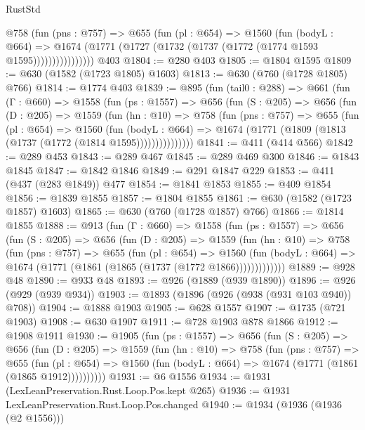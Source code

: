 \begin{lexlean}{RustStd}
\begin{coremodule}
{\begin{coremodule}
{{{{{{{{{{                @758
                  (fun (pns : @757) =>
                  @655
                    (fun (pl : @654) =>
                    @1560
                      (fun (bodyL : @664) =>
                      @1674 (@1771 (@1727 (@1732 (@1737 (@1772 (@1774 @1593 @1595))))))))))))))))
    @403
@1804 := @280 @403
@1805 := @1804 @1595
@1809 := @630 (@1582 (@1723 @1805) @1603)
@1813 := @630 (@760 (@1728 @1805) @766)
@1814 := @1774 @403
@1839 := @895
    (fun (tail0 : @288) =>
    @661
      (fun (Γ : @660) =>
      @1558
        (fun (ps : @1557) =>
        @656
          (fun (S : @205) =>
          @656
            (fun (D : @205) =>
            @1559
              (fun (hn : @10) =>
              @758
                (fun (pns : @757) =>
                @655
                  (fun (pl : @654) =>
                  @1560
                    (fun (bodyL : @664) =>
                    @1674 (@1771 (@1809 (@1813 (@1737 (@1772 (@1814 @1595)))))))))))))))
@1841 := @411 (@414 @566)
@1842 := @289 @453
@1843 := @289 @467
@1845 := @289 @469 @300
@1846 := @1843 @1845
@1847 := @1842 @1846
@1849 := @291 @1847 @229
@1853 := @411 (@437 (@283 @1849)) @477
@1854 := @1841 @1853
@1855 := @409 @1854
@1856 := @1839 @1855
@1857 := @1804 @1855
@1861 := @630 (@1582 (@1723 @1857) @1603)
@1865 := @630 (@760 (@1728 @1857) @766)
@1866 := @1814 @1855
@1888 := @913
    (fun (Γ : @660) =>
    @1558
      (fun (ps : @1557) =>
      @656
        (fun (S : @205) =>
        @656
          (fun (D : @205) =>
          @1559
            (fun (hn : @10) =>
            @758
              (fun (pns : @757) =>
              @655
                (fun (pl : @654) =>
                @1560
                  (fun (bodyL : @664) => @1674 (@1771 (@1861 (@1865 (@1737 (@1772 @1866)))))))))))))
@1889 := @928 @48
@1890 := @933 @48
@1893 := @926 (@1889 (@939 @1890))
@1896 := @926 (@929 (@939 @934))
@1903 := @1893 (@1896 (@926 (@938 (@931 @103 @940)) @708))
@1904 := @1888 @1903
@1905 := @628 @1557
@1907 := @1735 (@721 @1903)
@1908 := @630 @1907
@1911 := @728 @1903 @878 @1866
@1912 := @1908 @1911
@1930 := @1905
    (fun (ps : @1557) =>
    @656
      (fun (S : @205) =>
      @656
        (fun (D : @205) =>
        @1559
          (fun (hn : @10) =>
          @758
            (fun (pns : @757) =>
            @655
              (fun (pl : @654) =>
              @1560 (fun (bodyL : @664) => @1674 (@1771 (@1861 (@1865 @1912))))))))))
@1931 := @6 @1556
@1934 := @1931 (LexLeanPreservation.Rust.Loop.Pos.kept @265)
@1936 := @1931 LexLeanPreservation.Rust.Loop.Pos.changed
@1940 := @1934 (@1936 (@1936 (@2 @1556)))
}}}}}}}}}}
\end{coremodule}}
\end{coremodule}
\end{lexlean}
